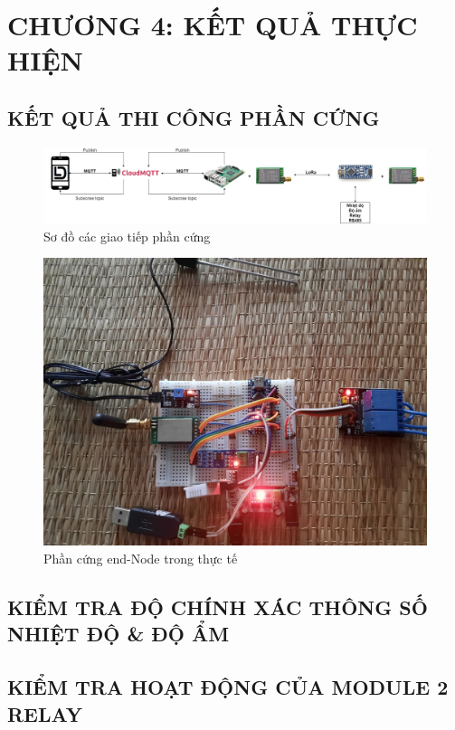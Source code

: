 \section*{CHƯƠNG 4: KẾT QUẢ THỰC HIỆN}
\setcounter{section}{4}
\setcounter{figure}{0}
\setcounter{subsection}{0}
\subsection{KẾT QUẢ THI CÔNG PHẦN CỨNG}
\begin{figure}[H]
	\centering
	\includegraphics[scale=0.2]{Chapter 4/image chapter 4/figure.png}
	\caption[Sơ đồ các giao tiếp phần cứng]{Sơ đồ các giao tiếp phần cứng}
	\label{hinh41}
\end{figure}
\begin{figure}[H]
	\centering
	\includegraphics[scale=0.2]{Chapter 4/image chapter 4/phancung.jpg}
	\caption[Phần cứng end-Node trong thực tế]{Phần cứng end-Node trong thực tế}
	\label{hinh42}
\end{figure}
\subsection{KIỂM TRA ĐỘ CHÍNH XÁC THÔNG SỐ NHIỆT ĐỘ \& ĐỘ ẨM}
\subsection{KIỂM TRA HOẠT ĐỘNG CỦA MODULE 2 RELAY}